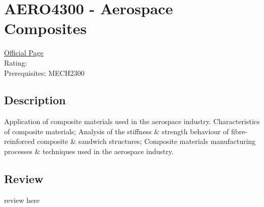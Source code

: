 \hypertarget{AERO4300}{\section{AERO4300 - Aerospace Composites}}

\large
\textcolor{turbo_purple}{\href{https://my.uq.edu.au/programs-courses/course.html?course_code=AERO4300}{Official Page}} \\
Rating: \cstar\cstar\cstar\cstar\ostar \\
Prerequisites: MECH2300 \\

\normalsize
\subsection*{Description}
Application of composite materials used in the aerospace industry.
Characteristics of composite materials; Analysis of the stiffness \& strength behaviour of fibre-reinforced composite \& sandwich structures; Composite materials manufacturing processes \& techniques used in the aerospace industry.

\subsection*{Review}
review here
